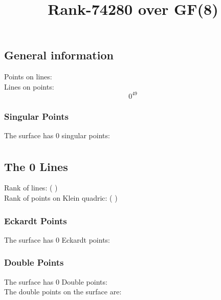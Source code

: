 \documentclass{article}
\newcommand\setTBstruts{\def\T{\rule{0pt}{2.6ex}}%
\def\B{\rule[-1.2ex]{0pt}{0pt}}}
\begin{document}
 
\setTBstruts



{\allowdisplaybreaks%






\title{Rank-74280 over GF(8)}
\author{}%
\maketitle%
%
{}



\subsection*{General information}
Points on lines:
$$
$$
Lines on points:
$$
0^{49}$$
\subsubsection*{Singular Points}
The surface has 0 singular points:\\
\begin{align*}
\end{align*}
\subsection*{The 0 Lines}
Rank of lines: (  )\\
Rank of points on Klein quadric: (  )\\
\subsubsection*{Eckardt Points}
The surface has 0 Eckardt points:\\
\subsubsection*{Double Points}
The surface has 0 Double points:\\
The double points on the surface are:\\
\begin{multicols}{2}
\noindent
\end{multicols}
}
\end{document}
